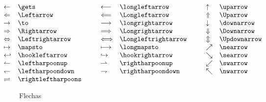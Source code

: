 \begin{table}
$$
\hspace{-1cm}
\begin{array}{ll@{\hspace{1cm}}ll@{\hspace{1cm}}ll}
\gets & \verb+\gets+ &
\longleftarrow & \verb+\longleftarrow+ &
\uparrow & \verb+\uparrow+ \\
\Leftarrow & \verb+\Leftarrow+ &
\Longleftarrow & \verb+\Longleftarrow+ &
\Uparrow & \verb+\Uparrow+ \\
\to & \verb+\to+ &
\longrightarrow & \verb+\longrightarrow+ &
\downarrow & \verb+\downarrow+ \\
\Rightarrow & \verb+\Rightarrow+ &
\Longrightarrow & \verb+\Longrightarrow+ &
\Downarrow & \verb+\Downarrow+ \\
\Leftrightarrow & \verb+\Leftrightarrow+ &
\Longleftrightarrow & \verb+\Longleftrightarrow+ &
\Updownarrow & \verb+\Updownarrow+ \\
\mapsto & \verb+\mapsto+ &
\longmapsto & \verb+\longmapsto+ &
\nearrow & \verb+\nearrow+ \\
\hookleftarrow & \verb+\hookleftarrow+ &
\hookrightarrow & \verb+\hookrightarrow+ &
\searrow & \verb+\searrow+ \\
\leftharpoonup & \verb+\leftharpoonup+ &
\rightharpoonup & \verb+\rightharpoonup+ &
\swarrow & \verb+\swarrow+ \\
\leftharpoondown & \verb+\leftharpoondown+ &
\rightharpoondown & \verb+\rightharpoondown+ &
\nwarrow & \verb+\nwarrow+ \\
\rightleftharpoons & \verb+\rightleftharpoons+  \\
\end{array}
$$
\caption{Flechas}
\label{flechas}
\end{table}

